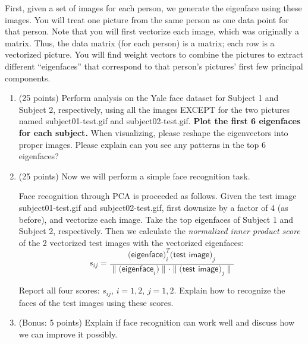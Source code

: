 \documentclass[twoside,10pt]{article}
\begin{document}
First, given a set of images for each person, we generate the eigenface using these images. You will treat one picture from the same person as one data point for that person. Note that you will first vectorize each image, which was originally a matrix. Thus, the data matrix (for each person) is a matrix; each row is a vectorized picture. You will find weight vectors to combine the pictures to extract different ``eigenfaces'' that correspond to that person's pictures' first few principal components. 


\begin{enumerate}

\item (25 points) Perform analysis on the Yale face dataset for Subject 1 and Subject 2, respectively, using all the images EXCEPT for the two pictures named \textsf{subject01-test.gif} and \textsf{subject02-test.gif}. {\bf Plot the first 6 eigenfaces for each subject.} When visualizing, please reshape the eigenvectors into proper images. Please explain can you see any patterns in the top 6 eigenfaces?

\item (25 points) Now we will perform a simple face recognition task. 

Face recognition through PCA is proceeded as follows. Given the test image \textsf{subject01-test.gif} and \textsf{subject02-test.gif}, first downsize by a factor of 4 (as before), and vectorize each image. Take the top eigenfaces of Subject 1 and Subject 2, respectively. Then we calculate the {\it normalized inner product score} of the 2 vectorized test images with the vectorized eigenfaces:
\[s_{ij} =\frac{\textsf{(eigenface})_i^T \textsf{(test image)}_j}{\|\textsf{(eigenface}_i)\| \cdot\|\textsf{(test image)}_j\|}\]

Report all four scores: $s_{ij}$, $i = 1, 2$, $j = 1, 2.$ Explain how to recognize the faces of the test images using these scores. 

\item (Bonus: 5 points) Explain if face recognition can work well and discuss how we can improve it possibly. 


\end{enumerate}
\end{document}
